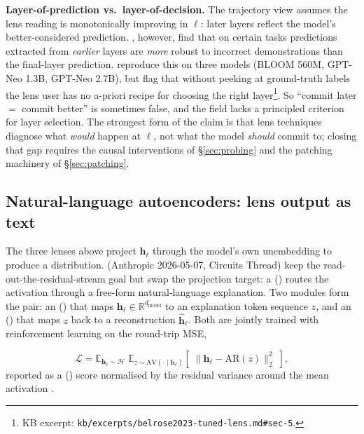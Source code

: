 \begin{contradiction}
\textbf{Layer-of-prediction vs.\ layer-of-decision.} The trajectory
view assumes the lens reading is monotonically improving in $\ell$:
later layers reflect the model's better-considered prediction.
\citet{halawi2023-overthinking}, however, find that on certain tasks
predictions extracted from \emph{earlier} layers are \emph{more}
robust to incorrect demonstrations than the final-layer prediction.
\citet[\S 5.2]{belrose2023-tuned-lens} reproduce this on three models
(BLOOM 560M, GPT-Neo 1.3B, GPT-Neo 2.7B), but flag that without
peeking at ground-truth labels the lens user has no a-priori recipe
for choosing the right layer\footnote{KB excerpt:
\nolinkurl{kb/excerpts/belrose2023-tuned-lens.md#sec-5}.}. So
``commit later $=$ commit better'' is sometimes false, and the field
lacks a principled criterion for layer selection. The strongest
form of the claim is that lens techniques diagnose what \emph{would}
happen at $\ell$, not what the model \emph{should} commit to; closing
that gap requires the causal interventions of \S\ref{sec:probing}
and the patching machinery of \S\ref{sec:patching}.
\end{contradiction}

\subsection{Natural-language autoencoders: lens output as text}
\label{sec:nla}

The three lenses above project $\mathbf{h}_\ell$ through the model's
own unembedding to produce a  distribution. \citet{anthropic2026-nla}
(Anthropic 2026-05-07,  Circuits Thread) keep the
read-out-the-residual-stream goal but swap the projection target:
a 
() routes the activation through a free-form natural-language
explanation. Two  modules form the pair: an
 () that
maps $\mathbf{h}_\ell \in \mathbb{R}^{d_\mathrm{model}}$ to an
explanation token sequence $z$, and an
 () that
maps $z$ back to a reconstruction $\hat{\mathbf{h}}_\ell$. Both are
jointly trained with reinforcement learning on the round-trip MSE,

\begin{equation}
\mathcal{L} = \mathbb{E}_{\mathbf{h}_\ell \sim \mathcal{H}}\;
              \mathbb{E}_{z \sim \mathrm{AV}(\cdot \mid \mathbf{h}_\ell)}
              \left[\; \lVert \mathbf{h}_\ell - \mathrm{AR}(z) \rVert_2^2 \;\right],
\label{eq:nla-loss}
\end{equation}
reported as a  () score normalised by the residual variance
around the mean activation \citep[\S Method;
kb/excerpts/anthropic2026-nla\#sec-method]{anthropic2026-nla}.

